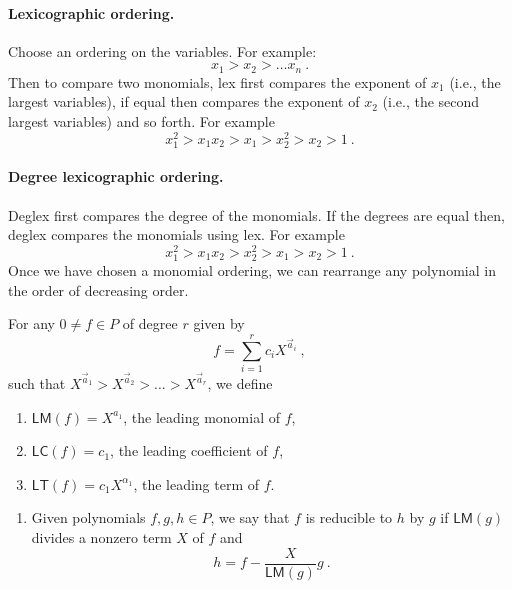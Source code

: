 \documentclass[a4paper,10pt]{article}
\newcommand{\mr}[1]{\mathsf{#1}}
\begin{document}
\begin{appendix}
\paragraph{Lexicographic ordering.} Choose an ordering on the variables. For example:
    \begin{equation}
        x_1>x_2>\dots x_n~.
    \end{equation}
Then to compare two monomials, lex first compares the exponent of $x_1$ (i.e., the largest variables), if equal then compares the exponent of $x_2$ (i.e., the second largest variables) and so forth. For example  \begin{equation}
    x_1^2>x_1 x_2>x_1>x_2^2>x_2>1~.
\end{equation}   
\paragraph{Degree lexicographic ordering.}
Deglex first compares the degree of the monomials. If the degrees are equal then, deglex compares the monomials using lex. For example
\begin{equation}
    x_1^2>x_1 x_2>x_2^2>x_1>x_2>1~.
\end{equation}
Once we have chosen a monomial ordering, we can rearrange any polynomial in the order of decreasing order. 
\begin{defn}
For any $0\neq f\in P$ of degree $r$ given by 
\begin{equation}
    f=\sum_{i=1}^rc_iX^{\vec{a}_i}~,
\end{equation}
such that $X^{\vec{a}_1}>X^{\vec{a}_2}>\dots>X^{\vec{a}_r}$, we define 
\begin{enumerate}[(1)]
    \item $\mathsf{LM}(f)=X^{a_1}$, the leading monomial of $f$,
\item $\mathsf{LC}(f)=c_1$, the leading coefficient of $f$,
\item $\mathsf{LT}(f)=c_1 X^{\alpha_1}$, the leading term of $f$.
\end{enumerate}
\end{defn}
\begin{defn}
\begin{enumerate}[(1)]
    \item Given polynomials $f,g,h\in P$, we say that $f$ is reducible to $h$ by $g$ if $\mr{LM}(g)$ divides a nonzero term $X$ of $f$ and 
    \begin{equation}
        h=f-\frac{X}{\mr{LM}(g)}g~.
    \end{equation}

\end{enumerate}
\end{defn}
\end{appendix}
\end{document}
